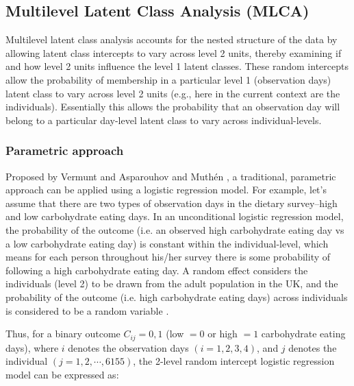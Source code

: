 
\subsection{Multilevel Latent Class Analysis (MLCA)}\vspace{-0.3cm}


Multilevel latent class analysis accounts for the nested structure of the data by allowing latent class intercepts to vary across level 2 units, thereby examining if and how level 2 units influence the level 1 latent classes. These random intercepts allow the probability of membership in a particular level 1 (observation days) latent class to vary across level 2 units (e.g., here in the current context are the individuals). Essentially this allows the probability that an observation day will belong to a
particular day-level latent class to vary across individual-levels.\vspace{-0.5cm}

\subsubsection{Parametric approach}\vspace{-0.3cm}

Proposed by Vermunt \parencite{Vermunt, vermunt2008latent} and Asparouhov and Muth\'en \parencite{muthen2009multilevel},  a traditional, parametric approach can be applied using a logistic regression model. For example, let's assume that there are two types of observation days in the dietary survey--high and low carbohydrate eating days. In an unconditional logistic regression model, the probability of the outcome (i.e. an observed high carbohydrate eating day vs a low carbohydrate eating day) is constant within the individual-level, which means for each person throughout his/her survey there is some probability of following a high carbohydrate eating day. A random effect considers the individuals (level 2) to be drawn from the adult population in the UK, and the probability of the outcome (i.e. high carbohydrate eating days) across individuals is considered to be a random variable \parencite{snijders2011multilevel}. 

Thus, for a binary outcome $C_{ij} = 0, 1$ (low $=0$ or high $=1$ carbohydrate eating days), where $i$ denotes the observation days $(i = 1, 2, 3, 4)$, and $j$ denotes the individual $(j = 1, 2, \cdots, 6155)$, the 2-level random intercept logistic regression model can be expressed as:\vspace{-0.4cm}


